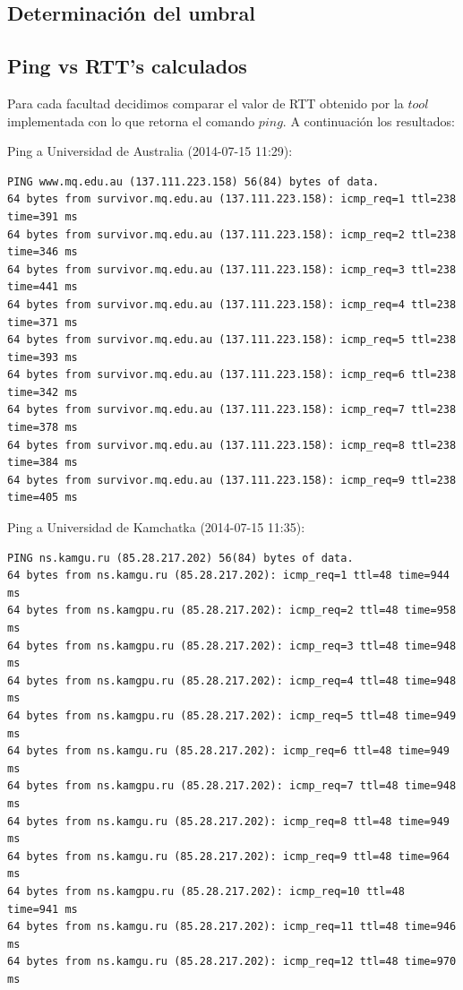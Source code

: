 \subsection{Determinación del umbral}



\subsection{Ping vs RTT's calculados}

Para cada facultad decidimos comparar el valor de RTT obtenido por la $tool$ implementada con lo que retorna el comando $ping$. A continuación los resultados:

Ping a Universidad de Australia (2014-07-15 11:29):
\begin{verbatim}
PING www.mq.edu.au (137.111.223.158) 56(84) bytes of data.
64 bytes from survivor.mq.edu.au (137.111.223.158): icmp_req=1 ttl=238 time=391 ms
64 bytes from survivor.mq.edu.au (137.111.223.158): icmp_req=2 ttl=238 time=346 ms
64 bytes from survivor.mq.edu.au (137.111.223.158): icmp_req=3 ttl=238 time=441 ms
64 bytes from survivor.mq.edu.au (137.111.223.158): icmp_req=4 ttl=238 time=371 ms
64 bytes from survivor.mq.edu.au (137.111.223.158): icmp_req=5 ttl=238 time=393 ms
64 bytes from survivor.mq.edu.au (137.111.223.158): icmp_req=6 ttl=238 time=342 ms
64 bytes from survivor.mq.edu.au (137.111.223.158): icmp_req=7 ttl=238 time=378 ms
64 bytes from survivor.mq.edu.au (137.111.223.158): icmp_req=8 ttl=238 time=384 ms
64 bytes from survivor.mq.edu.au (137.111.223.158): icmp_req=9 ttl=238 time=405 ms

\end{verbatim}

Ping a Universidad de Kamchatka (2014-07-15 11:35):

\begin{verbatim}
PING ns.kamgu.ru (85.28.217.202) 56(84) bytes of data.
64 bytes from ns.kamgu.ru (85.28.217.202): icmp_req=1 ttl=48 time=944 ms
64 bytes from ns.kamgpu.ru (85.28.217.202): icmp_req=2 ttl=48 time=958 ms
64 bytes from ns.kamgpu.ru (85.28.217.202): icmp_req=3 ttl=48 time=948 ms
64 bytes from ns.kamgpu.ru (85.28.217.202): icmp_req=4 ttl=48 time=948 ms
64 bytes from ns.kamgpu.ru (85.28.217.202): icmp_req=5 ttl=48 time=949 ms
64 bytes from ns.kamgu.ru (85.28.217.202): icmp_req=6 ttl=48 time=949 ms
64 bytes from ns.kamgpu.ru (85.28.217.202): icmp_req=7 ttl=48 time=948 ms
64 bytes from ns.kamgu.ru (85.28.217.202): icmp_req=8 ttl=48 time=949 ms
64 bytes from ns.kamgu.ru (85.28.217.202): icmp_req=9 ttl=48 time=964 ms
64 bytes from ns.kamgpu.ru (85.28.217.202): icmp_req=10 ttl=48 time=941 ms
64 bytes from ns.kamgu.ru (85.28.217.202): icmp_req=11 ttl=48 time=946 ms
64 bytes from ns.kamgu.ru (85.28.217.202): icmp_req=12 ttl=48 time=970 ms
\end{verbatim}

